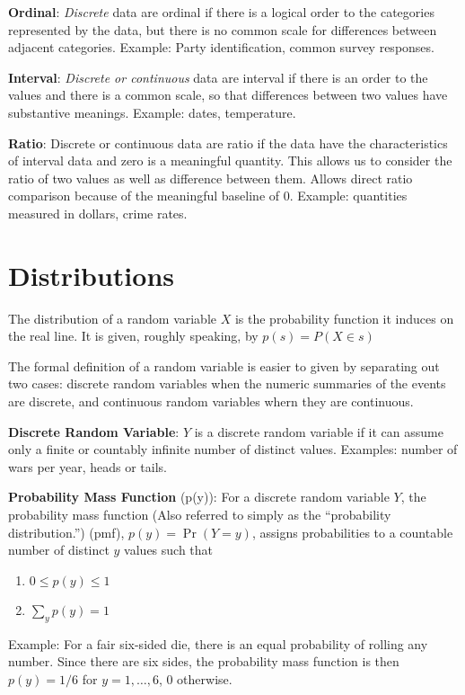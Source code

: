 \documentclass[]{book}
\providecommand{\tightlist}{%
  \setlength{\itemsep}{0pt}\setlength{\parskip}{0pt}}
\theoremstyle{definition}
\theoremstyle{definition}
\theoremstyle{definition}
\theoremstyle{remark}
\begin{document}
\textbf{Ordinal}: \textit{Discrete} data are ordinal if there is a
logical order to the categories represented by the data, but there is no
common scale for differences between adjacent categories. Example: Party
identification, common survey responses.

\textbf{Interval}: \textit{Discrete or continuous} data are interval if
there is an order to the values and there is a common scale, so that
differences between two values have substantive meanings. Example:
dates, temperature.

\textbf{Ratio}: Discrete or continuous data are ratio if the data have
the characteristics of interval data and zero is a meaningful quantity.
This allows us to consider the ratio of two values as well as difference
between them. Allows direct ratio comparison because of the meaningful
baseline of 0. Example: quantities measured in dollars, crime rates.

\section{Distributions}\label{distributions}

The distribution of a random variable \(X\) is the probability function
it induces on the real line. It is given, roughly speaking, by
\(p(s) = P(X \in s)\)

The formal definition of a random variable is easier to given by
separating out two cases: discrete random variables when the numeric
summaries of the events are discrete, and continuous random variables
whern they are continuous.

\textbf{Discrete Random Variable}: \(Y\) is a discrete random variable
if it can assume only a finite or countably infinite number of distinct
values. Examples: number of wars per year, heads or tails.

\textbf{Probability Mass Function} (p(y)): For a discrete random
variable \(Y\), the probability mass function (Also referred to simply
as the ``probability distribution.'') (pmf), \(p(y)=\Pr(Y=y)\), assigns
probabilities to a countable number of distinct \(y\) values such that

\begin{enumerate}
\def\labelenumi{\arabic{enumi}.}
\tightlist
\item
  \(0\le p(y)\le 1\)
\item
  \(\sum\limits_y p(y)=1\)
\end{enumerate}

\parbox[t]{5in}{Example: For a fair six-sided die, there is an equal probability of rolling any number.  Since there are six sides, the probability mass function is then $p(y)=1/6$ for $y=1,\ldots,6$, 0 otherwise.}
\end{document}
